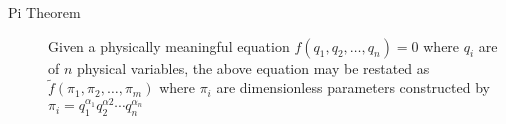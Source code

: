 \documentclass[8pt]{article}
\begin{document}

\begin{multicols}{2}
  \begin{description}
  \item[Pi Theorem] Given a physically meaningful equation
    $f(q_1,q_2,\ldots,q_n)=0$ where $q_i$ are of $n$ physical variables, the
    above equation may be restated as $\tilde{f}(\pi_1,\pi_2,\ldots,\pi_m)$
    where $\pi_i$ are dimensionless parameters constructed by
    $\pi_i=q_1^{\alpha_1}q_2^{\alpha 2}\cdots q_n^{\alpha_n}$
  \end{description}
\end{multicols}
\end{document}
